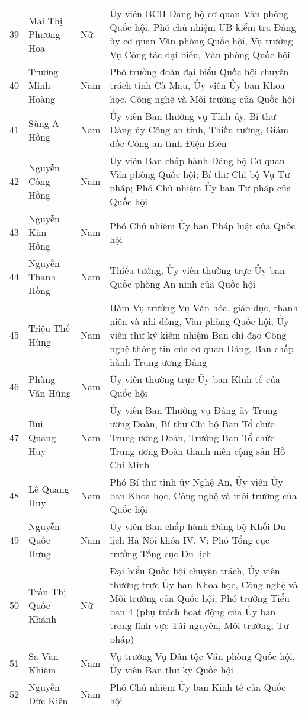 \begin{longtable}{p{}p{}p{}p{}}
39 &
  Mai Thị Phương Hoa &
  Nữ &
  Ủy viên BCH Đảng bộ cơ quan Văn phòng Quốc hội, Phó chủ nhiệm UB kiểm tra Đảng ủy cơ quan Văn phòng Quốc hội, Vụ trưởng Vụ Công tác đại biểu, Văn phòng Quốc hội \\
40 &
  Trương Minh Hoàng &
  Nam &
  Phó trưởng đoàn đại biểu Quốc hội chuyên trách tỉnh Cà Mau, Ủy viên Ủy ban Khoa học, Công nghệ và Môi trường của Quốc hội \\
41 &
  Sùng A Hồng &
  Nam &
  Ủy viên Ban thường vụ Tỉnh ủy, Bí thư Đảng ủy Công an tỉnh, Thiếu tướng, Giám đốc Công an tỉnh Điện Biên \\
42 &
  Nguyễn Công Hồng &
  Nam &
  Ủy viên Ban chấp hành Đảng bộ Cơ quan Văn phòng Quốc hội; Bí thư Chi bộ Vụ Tư pháp; Phó Chủ nhiệm Ủy ban Tư pháp của Quốc hội \\
43 &
  Nguyễn Kim Hồng &
  Nam &
  Phó Chủ nhiệm Ủy ban Pháp luật của Quốc hội \\
44 &
  Nguyễn Thanh Hồng &
  Nam &
  Thiếu tướng, Ủy viên thường trực Ủy ban Quốc phòng An ninh của Quốc hội \\
45 &
  Triệu Thế Hùng &
  Nam &
  Hàm Vụ trưởng Vụ Văn hóa, giáo dục, thanh niên và nhi đồng, Văn phòng Quốc hội, Ủy viên thư ký kiêm nhiệm Ban chỉ đạo Công nghệ thông tin của cơ quan Đảng, Ban chấp hành Trung ương Đảng \\
46 &
  Phùng Văn Hùng &
  Nam &
  Ủy viên thường trực Ủy ban Kinh tế của Quốc hội \\
47 &
  Bùi Quang Huy &
  Nam &
  Ủy viên Ban Thường vụ Đảng ủy Trung ương Đoàn, Bí thư Chi bộ Ban Tổ chức Trung ương Đoàn, Trưởng Ban Tổ chức Trung ương Đoàn thanh niên cộng sản Hồ Chí Minh \\
48 &
  Lê Quang Huy &
  Nam &
  Phó Bí thư tỉnh ủy Nghệ An, Ủy viên Ủy ban Khoa học, Công nghệ và môi trường của Quốc hội \\
49 &
  Nguyễn Quốc Hưng &
  Nam &
  Ủy viên Ban chấp hành Đảng bộ Khối Du lịch Hà Nội khóa IV, V; Phó Tổng cục trưởng Tổng cục Du lịch \\
50 &
  Trần Thị Quốc Khánh &
  Nữ &
  Đại biểu Quốc hội chuyên trách, Ủy viên thường trực Ủy ban Khoa học, Công nghệ và Môi trường của Quốc hội; Phó trưởng Tiểu ban 4 (phụ trách hoạt động của Ủy ban trong lĩnh vực Tài nguyên, Môi trường, Tư pháp) \\
51 &
  Sa Văn Khiêm &
  Nam &
  Vụ trưởng Vụ Dân tộc Văn phòng Quốc hội, Ủy viên Ban thư ký Quốc hội \\
52 &
  Nguyễn Đức Kiên &
  Nam &
  Phó Chủ nhiệm Ủy ban Kinh tế của Quốc hội \\

\end{longtable}
